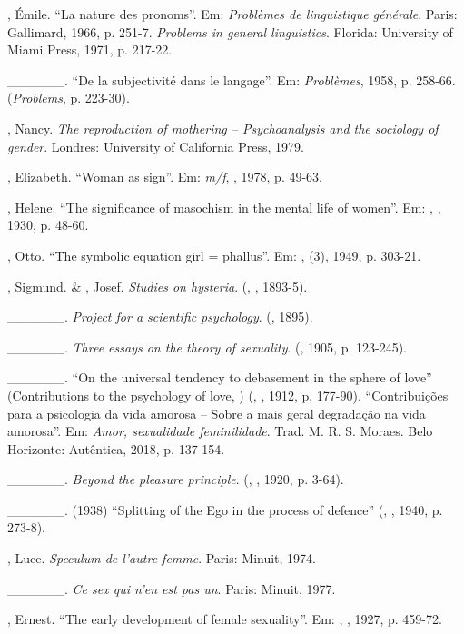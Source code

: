 \begin{Parskip}
, Émile. ``La nature des pronoms''. Em: \emph{Problèmes de
linguistique générale}. Paris: Gallimard, 1966, p. 251-7.
\emph{Problems in general linguistics}. Florida: University of Miami
Press, 1971, p. 217-22.

\_\_\_\_\_\_. ``De la subjectivité dans le langage''. Em: \emph{Problèmes}, 1958, p. 258-66.
(\emph{Problems}, p. 223-30).

, Nancy. \emph{The reproduction of mothering -- Psychoanalysis and
the sociology of gender}. Londres: University of California Press, 1979.

, Elizabeth. ``Woman as sign''. Em: \emph{m/f}, , 1978, p. 49-63.

, Helene. ``The significance of masochism in the mental life of women''. Em:
\emph{}, , 1930, p. 48-60.

, Otto. ``The symbolic equation girl = phallus''. Em: \emph{},  (3), 1949, p. 303-21.

, Sigmund. \& , Josef. \emph{Studies on hysteria}. (, , 1893-5).

\_\_\_\_\_\_. \emph{Project for a scientific psychology}. (, 1895).

\_\_\_\_\_\_. \emph{Three essays on the theory of sexuality}. (, 1905, p. 123-245).

\_\_\_\_\_\_. ``On the universal tendency to debasement in the sphere of love'' (Contributions to the psychology of love, ) (, , 1912, p. 177-90). 
``Contribuições para a psicologia da vida amorosa -- Sobre a
mais geral degradação na vida amorosa''. Em: \emph{Amor, sexualidade feminilidade}. Trad. M. R. S. Moraes. Belo Horizonte: Autêntica, 2018, p. 137-154.

\_\_\_\_\_\_. \emph{Beyond the pleasure principle}. (, , 1920, p. 3-64).

\_\_\_\_\_\_. (1938) ``Splitting of the Ego in the process of
defence'' (, , 1940, p. 273-8).

, Luce. \emph{Speculum de l'autre femme}. Paris: Minuit, 1974.

\_\_\_\_\_\_. \emph{Ce sex qui n'en est pas un}. Paris: Minuit, 1977.

, Ernest. ``The early development of female sexuality''. Em:
\emph{}, , 1927, p. 459-72.


\end{Parskip}
